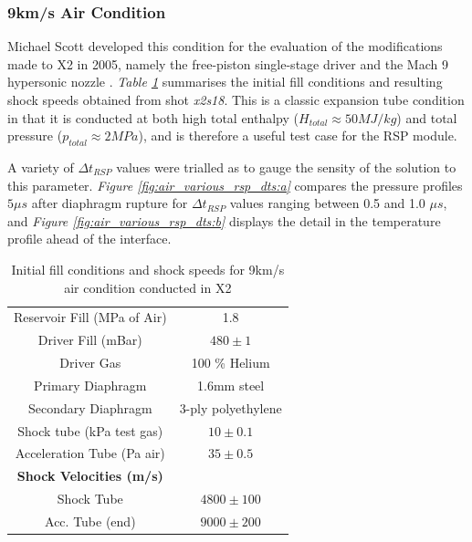 \documentclass[a4paper,10pt]{article}
\begin{document}
\subsubsection{9km/s Air Condition}

Michael Scott developed this condition for the evaluation of the modifications made to X2 in 2005, namely the free-piston single-stage driver and the Mach 9 hypersonic nozzle \cite{scott}.  \emph{Table \ref{table:x2_air_fills}} summarises the initial fill conditions and resulting shock speeds obtained from shot \emph{x2s18}.  This is a classic expansion tube condition in that it is conducted at both high total enthalpy ($H_{total} \approx 50MJ/kg$) and total pressure ($p_{total} \approx 2 MPa$), and is therefore a useful test case for the RSP module.

\par \medskip

A variety of $\Delta t_{RSP}$ values were trialled as to gauge the sensity of the solution to this parameter.  \emph{Figure \ref{fig:air_various_rsp_dts:a}} compares the pressure profiles $5 \mu s$ after diaphragm rupture for $\Delta t_{RSP}$ values ranging between 0.5 and 1.0 $\mu s$, and \emph{Figure \ref{fig:air_various_rsp_dts:b}} displays the detail in the temperature profile ahead of the interface. 

\begin{table}[hbc]
\begin{center}  %
\begin{tabular*}{0.65\textwidth}%
     {@{\extracolsep{\fill}}cc}
\hline Reservoir Fill (MPa of Air) & 1.8 \\
Driver Fill (mBar) & $480 \pm 1$ \\
Driver Gas & 100 \% Helium \\
Primary Diaphragm & 1.6mm steel \\
Secondary Diaphragm & 3-ply polyethylene \\
Shock tube (kPa test gas) & $ 10 \pm 0.1$ \\
Acceleration Tube (Pa air) & $35 \pm 0.5$ \\
\textbf{Shock Velocities (m/s)} \\
Shock Tube & $4800 \pm 100$ \\
Acc. Tube (end) & $9000 \pm 200$   \\
\hline
\end{tabular*}
\caption{Initial fill conditions and shock speeds for 9km/s air condition conducted in X2}
\label{table:x2_air_fills}
\end{center}
\end{table}
\end{document}
